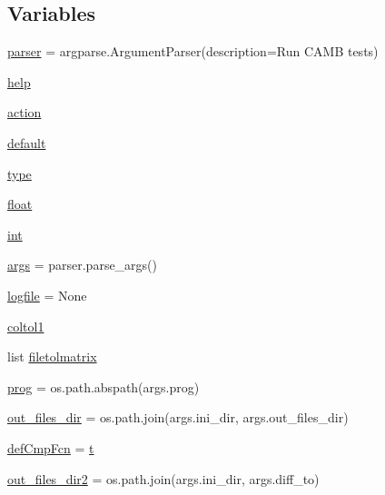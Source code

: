 \subsection*{Variables}
\begin{DoxyCompactItemize}
\item 
\mbox{\hyperlink{namespaceCAMB__test__files_a1b844d4828dfe6615651d8b42373f8f8}{parser}} = argparse.\+Argument\+Parser(description=\textquotesingle{}Run C\+A\+MB tests\textquotesingle{})
\item 
\mbox{\hyperlink{namespaceCAMB__test__files_a5e8a642e477196d509273a7c1ce53a47}{help}}
\item 
\mbox{\hyperlink{namespaceCAMB__test__files_a51e0ffc6519b279097bc3783fc657a3f}{action}}
\item 
\mbox{\hyperlink{namespaceCAMB__test__files_a87d8516a02241b4fa206803719f7597a}{default}}
\item 
\mbox{\hyperlink{namespaceCAMB__test__files_a8edfea438971669fea3e0775bd14263a}{type}}
\item 
\mbox{\hyperlink{namespaceCAMB__test__files_ae415889d382c2b3dee8dea1dd987ebb0}{float}}
\item 
\mbox{\hyperlink{namespaceCAMB__test__files_ae3f939a649209ec8d0004b0dfef3210b}{int}}
\item 
\mbox{\hyperlink{namespaceCAMB__test__files_adeeef79cdcea327b75fcb678864b86a4}{args}} = parser.\+parse\+\_\+args()
\item 
\mbox{\hyperlink{namespaceCAMB__test__files_a5fd75937aae4359cdd82917c369cbdd0}{logfile}} = None
\item 
\mbox{\hyperlink{namespaceCAMB__test__files_acc5d4d38c68aeefa893c842c45f7b574}{coltol1}}
\item 
list \mbox{\hyperlink{namespaceCAMB__test__files_a325a83c6a5bc77af11b528f15bb821e0}{filetolmatrix}}
\item 
\mbox{\hyperlink{namespaceCAMB__test__files_ad45bde770497a23cf5cfa89d855229d3}{prog}} = os.\+path.\+abspath(args.\+prog)
\item 
\mbox{\hyperlink{namespaceCAMB__test__files_aab425eab53a3ec49aec1a01880b7bad7}{out\+\_\+files\+\_\+dir}} = os.\+path.\+join(args.\+ini\+\_\+dir, args.\+out\+\_\+files\+\_\+dir)
\item 
\mbox{\hyperlink{namespaceCAMB__test__files_aa74109e69e8ed8e8a518bb379902a1a0}{def\+Cmp\+Fcn}} = \mbox{\hyperlink{plotcls_8m_aaccc9105df5383111407fd5b41255e23}{t}}
\item 
\mbox{\hyperlink{namespaceCAMB__test__files_aa5f31d42250044659990e7a019e90d98}{out\+\_\+files\+\_\+dir2}} = os.\+path.\+join(args.\+ini\+\_\+dir, args.\+diff\+\_\+to)

\end{DoxyCompactItemize}

